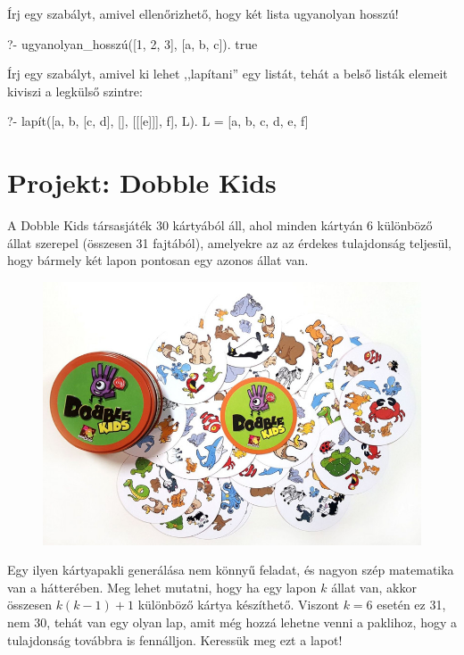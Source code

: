 \begin{problem}
Írj egy szabályt, amivel ellenőrizhető, hogy két
lista ugyanolyan hosszú!
\begin{query}
?- ugyanolyan_hosszú([1, 2, 3], [a, b, c]).
true
\end{query}
\end{problem}
\begin{problem}
Írj egy szabályt, amivel ki lehet ,,lapítani''
egy listát, tehát a belső listák elemeit kiviszi a
legkülső szintre:
\begin{query}
?- lapít([a, b, [c, d], [], [[[e]]], f], L).
L = [a, b, c, d, e, f]
\end{query}
\end{problem}
\section{Projekt: Dobble Kids}
A Dobble Kids társasjáték 30 kártyából áll, ahol
minden kártyán 6 különböző állat szerepel (összesen
31 fajtából), amelyekre az az érdekes tulajdonság
teljesül, hogy bármely két lapon pontosan egy azonos
állat van.
\begin{figure}[ht]
\begin{center}
\includegraphics[width=\textwidth]{images/dobble-kids.jpg}
\end{center}
\end{figure}
Egy ilyen kártyapakli generálása nem könnyű feladat,
és nagyon szép matematika van a hátterében. Meg
lehet mutatni, hogy ha egy lapon $k$ állat van,
akkor összesen $k(k-1)+1$ különböző kártya
készíthető. Viszont $k = 6$ esetén ez 31, nem 30,
tehát van egy olyan lap, amit még hozzá lehetne
venni a paklihoz, hogy a tulajdonság továbbra is
fennálljon. Keressük meg ezt a lapot!

